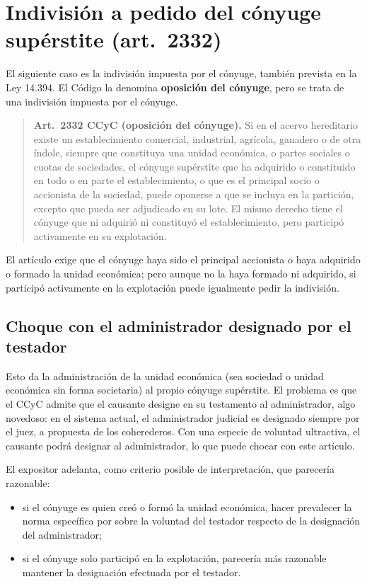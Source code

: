 \documentclass[12pt,oneside]{book}
\begin{document}
\section{Indivisión a pedido del cónyuge supérstite (art.~2332)}

El siguiente caso es la indivisión impuesta por el cónyuge, también prevista en la Ley 14.394. El Código la denomina \textbf{oposición del cónyuge}, pero se trata de una indivisión impuesta por el cónyuge.

\begin{quote}
\textbf{Art.~2332 CCyC (oposición del cónyuge).} Si en el acervo hereditario existe un establecimiento comercial, industrial, agrícola, ganadero o de otra índole, siempre que constituya una unidad económica, o partes sociales o cuotas de sociedades, el cónyuge supérstite que ha adquirido o constituido en todo o en parte el establecimiento, o que es el principal socio o accionista de la sociedad, puede oponerse a que se incluya en la partición, excepto que pueda ser adjudicado en su lote. El mismo derecho tiene el cónyuge que ni adquirió ni constituyó el establecimiento, pero participó activamente en su explotación.
\end{quote}

El artículo exige que el cónyuge haya sido el principal accionista o haya adquirido o formado la unidad económica; pero aunque no la haya formado ni adquirido, si participó activamente en la explotación puede igualmente pedir la indivisión.

\subsection{Choque con el administrador designado por el testador}

Esto da la administración de la unidad económica (sea sociedad o unidad económica sin forma societaria) al propio cónyuge supérstite. El problema es que el CCyC admite que el causante designe en su testamento al administrador, algo novedoso: en el sistema actual, el administrador judicial es designado siempre por el juez, a propuesta de los coherederos. Con una especie de voluntad ultractiva, el causante podrá designar al administrador, lo que puede chocar con este artículo.

El expositor adelanta, como criterio posible de interpretación, que parecería razonable:

\begin{itemize}
    \item si el cónyuge es quien creó o formó la unidad económica, hacer prevalecer la norma específica por sobre la voluntad del testador respecto de la designación del administrador;
    \item si el cónyuge solo participó en la explotación, parecería más razonable mantener la designación efectuada por el testador.
\end{itemize}
\end{document}
